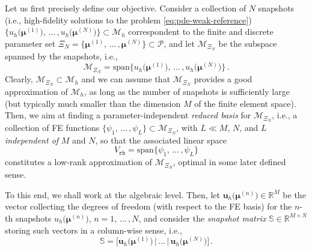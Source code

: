 \documentclass[12pt, a4paper, twoside, openright]{report}
\numberwithin{equation}{chapter}
\theoremstyle{theorem}
\theoremstyle{definition}
\theoremstyle{remark}
\theoremstyle{proposition}
\numberwithin{figure}{chapter}
\newcommand{\bg}[1]{\boldsymbol{#1}}
\begin{document}
		\algrenewcommand\textproc{\textsc}
				
		Let us first precisely define our objective. Consider a collection of $N$ snapshots (i.e., high-fidelity solutions to the problem \eqref{eq:pde-weak-reference}) $\big\lbrace u_h \big( \bg{\mu}^{(1)} \big), \, \ldots \, , u_h \big( \bg{\mu}^{(N)} \big) \big\rbrace \subset \mathcal{M}_h$ correspondent to the finite and discrete parameter set $\Xi_N = \big\lbrace \bg{\mu}^{(1)}, \, \ldots \, , \bg{\mu}^{(N)} \big\rbrace \subset \mathcal{P}$, and let $\mathcal{M}_{\Xi_N}$ be the subspace spanned by the snapshots, i.e.,
		\begin{equation*}
			\mathcal{M}_{\Xi_N} = \text{span} \big\lbrace u_h \big( \bg{\mu}^{(1)}), \, \ldots \, , u_h(\bg{\mu}^{(N)} \big) \big\rbrace \, .
		\end{equation*}
		Clearly, $\mathcal{M}_{\Xi_N} \subset \mathcal{M}_h$ and we can assume that $\mathcal{M}_{\Xi_N}$ provides a good approximation of $\mathcal{M}_h$, as long as the number of snapshots is sufficiently large (but typically much smaller than the dimension $M$ of the finite element space). Then, we aim at finding a parameter-independent \emph{reduced basis} for $\mathcal{M}_{\Xi_N}$, i.e., a collection of FE functions $\big\lbrace \psi_1, \, \ldots \, , \psi_L \big\rbrace \subset \mathcal{M}_{\Xi_N}$, with $L \ll M, \, N$, and $L$ \emph{independent of} $M$ and $N$, so that the associated linear space 
		\begin{equation*}
			V_{\texttt{rb}} = \text{span} \big\lbrace \psi_1, \, \ldots \, , \psi_L \big\rbrace
		\end{equation*}
		constitutes a low-rank approximation of $\mathcal{M}_{\Xi_N}$, optimal in some later defined sense.
		
		To this end, we shall work at the algebraic level. Then, let $\mathbf{u}_h \big( \bg{\mu}^{(n)} \big) \in \mathbb{R}^M$ be the vector collecting the degrees of freedom (with respect to the FE basis) for the $n$-th snapshots $u_h \big( \bg{\mu}^{(n)} \big)$, $n = 1, \, \ldots \, , N$, and consider the \emph{snapshot matrix} $\mathbb{S} \in \mathbb{R}^{M \times N}$ storing such vectors in a column-wise sense, i.e.,
		\begin{equation*}
			\mathbb{S} = \big[ \mathbf{u}_h \big( \bg{\mu}^{(1)} \big) \, \big| \, \ldots \, \big| \, \mathbf{u}_h \big( \bg{\mu}^{(N)} \big) \big] \, .
		\end{equation*}
		
\end{document}
